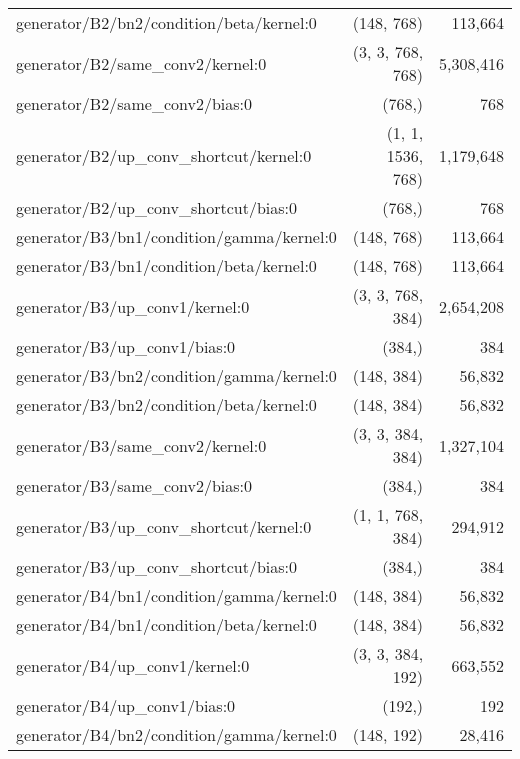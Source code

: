 \documentclass{article}
\begin{document}
\begin{table*}[h]
{\begin{tabular}{lrr}
generator/B2/bn2/condition/beta/kernel:0                  & (148, 768) &     113,664   \\
generator/B2/same\_conv2/kernel:0                    & (3, 3, 768, 768) &   5,308,416   \\
generator/B2/same\_conv2/bias:0                                & (768,) &         768   \\
generator/B2/up\_conv\_shortcut/kernel:0             & (1, 1, 1536, 768) &   1,179,648   \\
generator/B2/up\_conv\_shortcut/bias:0                          & (768,) &         768   \\
generator/B3/bn1/condition/gamma/kernel:0                 & (148, 768) &     113,664   \\
generator/B3/bn1/condition/beta/kernel:0                  & (148, 768) &     113,664   \\
generator/B3/up\_conv1/kernel:0                      & (3, 3, 768, 384) &   2,654,208   \\
generator/B3/up\_conv1/bias:0                                  & (384,) &         384   \\
generator/B3/bn2/condition/gamma/kernel:0                 & (148, 384) &      56,832   \\
generator/B3/bn2/condition/beta/kernel:0                  & (148, 384) &      56,832   \\
generator/B3/same\_conv2/kernel:0                    & (3, 3, 384, 384) &   1,327,104   \\
generator/B3/same\_conv2/bias:0                                & (384,) &         384   \\
generator/B3/up\_conv\_shortcut/kernel:0              & (1, 1, 768, 384) &     294,912   \\
generator/B3/up\_conv\_shortcut/bias:0                          & (384,) &         384   \\
generator/B4/bn1/condition/gamma/kernel:0                 & (148, 384) &      56,832   \\
generator/B4/bn1/condition/beta/kernel:0                  & (148, 384) &      56,832   \\
generator/B4/up\_conv1/kernel:0                      & (3, 3, 384, 192) &     663,552   \\
generator/B4/up\_conv1/bias:0                                  & (192,) &         192   \\
generator/B4/bn2/condition/gamma/kernel:0                 & (148, 192) &      28,416   \\

\end{tabular}}
\end{table*}
\end{document}
